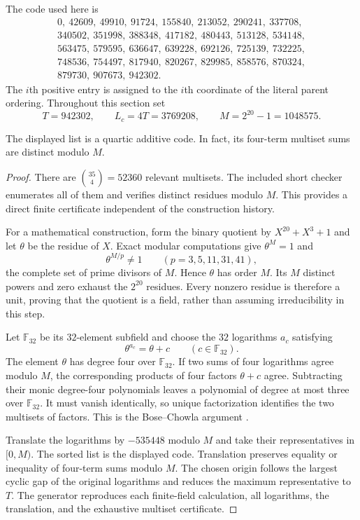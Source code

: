 The code used here is
\[
\begin{gathered}
0,\ 42609,\ 49910,\ 91724,\ 155840,\ 213052,\ 290241,\ 337708,\\
340502,\ 351998,\ 388348,\ 417182,\ 480443,\ 513128,\ 534148,\\
563475,\ 579595,\ 636647,\ 639228,\ 692126,\ 725139,\ 732225,\\
748536,\ 754497,\ 817940,\ 820267,\ 829985,\ 858576,\ 870324,\\
879730,\ 907673,\ 942302.
\end{gathered}
\]
The $i$th positive entry is assigned to the $i$th coordinate of the
literal parent ordering.  Throughout this section set
\[
 T=942302,\qquad L_c=4T=3769208,\qquad M=2^{20}-1=1048575.
 \tag{B4.4}\label{b4:span}
\]

\begin{lemma}
\label{b4:code}
The displayed list is a quartic additive code.  In fact, its four-term
multiset sums are distinct modulo $M$.
\end{lemma}

\begin{proof}
There are $\binom{35}{4}=52360$ relevant multisets.  The included
short checker enumerates all of them and verifies distinct residues
modulo $M$.  This provides a direct finite certificate independent of
the construction history.

For a mathematical construction, form the binary quotient by
$X^{20}+X^3+1$ and let $\theta$ be the residue of $X$.  Exact modular
computations give $\theta^M=1$ and
\[
 \theta^{M/p}\ne1\qquad(p=3,5,11,31,41),
\]
the complete set of prime divisors of $M$.  Hence $\theta$ has order
$M$.  Its $M$ distinct powers and zero exhaust the $2^{20}$ residues.
Every nonzero residue is therefore a unit, proving that the quotient
is a field, rather than assuming irreducibility in this step.

Let $\mathbb F_{32}$ be its $32$-element subfield and choose the
$32$ logarithms $a_c$ satisfying
\[
 \theta^{a_c}=\theta+c\qquad(c\in\mathbb F_{32}).
\]
The element $\theta$ has degree four over $\mathbb F_{32}$.  If two
sums of four logarithms agree modulo $M$, the corresponding products
of four factors $\theta+c$ agree.  Subtracting their monic
degree-four polynomials leaves a polynomial of degree at most three
over $\mathbb F_{32}$.  It must vanish identically, so unique
factorization identifies the two multisets of factors.  This is the
Bose--Chowla argument \cite{BoseChowla}.

Translate the logarithms by $-535448$ modulo $M$ and take their
representatives in $[0,M)$.  The sorted list is the displayed code.
Translation preserves equality or inequality of four-term sums
modulo $M$.  The chosen origin follows the largest cyclic gap of
the original logarithms and reduces the maximum representative to $T$.
The generator reproduces each finite-field calculation, all logarithms,
the translation, and the exhaustive multiset certificate.
\end{proof}

